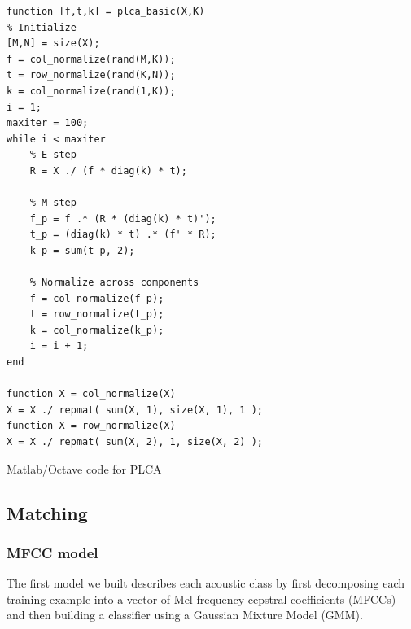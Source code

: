 \documentclass[a4paper,10pt,final]{ThesisStyle}
\begin{document}
\begin{program}
  \begin{verbatim}
function [f,t,k] = plca_basic(X,K)
% Initialize
[M,N] = size(X);
f = col_normalize(rand(M,K));
t = row_normalize(rand(K,N));
k = col_normalize(rand(1,K));
i = 1;
maxiter = 100;
while i < maxiter
    % E-step
    R = X ./ (f * diag(k) * t);
    
    % M-step
    f_p = f .* (R * (diag(k) * t)');
    t_p = (diag(k) * t) .* (f' * R);
    k_p = sum(t_p, 2);
    
    % Normalize across components
    f = col_normalize(f_p);
    t = row_normalize(t_p);
    k = col_normalize(k_p);
    i = i + 1;
end

function X = col_normalize(X)
X = X ./ repmat( sum(X, 1), size(X, 1), 1 );
function X = row_normalize(X)
X = X ./ repmat( sum(X, 2), 1, size(X, 2) );
\end{verbatim}
  \caption{Matlab/Octave code for PLCA}
\end{program}




\subsection{Matching}

\subsubsection{MFCC model}
The first model we built describes each acoustic class by first decomposing each training example into a vector of Mel-frequency cepstral coefficients (MFCCs) and then building a classifier using a Gaussian Mixture Model (GMM).  
\end{document}
